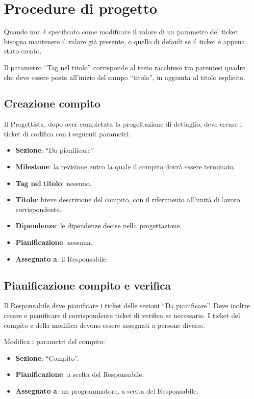 \section{Procedure di progetto}
\label{procedurediprogetto}

Quando non è specificato come modificare il valore di un parametro del ticket bisogna mantenere il valore già presente, o quello di default se il ticket è appena stato creato.

Il parametro ``Tag nel titolo'' corrisponde al testo racchiuso tra parentesi quadre che deve essere posto all'inizio del campo ``titolo'', in aggiunta al titolo esplicito.

\subsection{Creazione compito}

Il Progettista, dopo aver completata la progettazione di dettaglio, deve creare i ticket di codifica con i seguenti parametri:
\begin{itemize}
 \item \textbf{Sezione}: ``Da pianificare''
 \item \textbf{Milestone}: la revisione entro la quale il compito dovrà essere terminato.
 \item \textbf{Tag nel titolo}: nessuno.
 \item \textbf{Titolo}: breve descrizione del compito, con il riferimento all'unità di lavoro corrispondente.
 \item \textbf{Dipendenze}: le dipendenze decise nella progettazione.
 \item \textbf{Pianificazione}: nessuna.
 \item \textbf{Assegnato a}: il Responsabile.
\end{itemize}

\subsection{Pianificazione compito e verifica}

\label{pianificazione}
Il Responsabile deve pianificare i ticket delle sezioni ``Da pianificare''. Deve inoltre creare e pianificare il corrispondente ticket di verifica se necessario. I ticket del compito e della modifica devono essere assegnati a persone diverse.

Modifica i parametri del compito:
\begin{itemize}
 \item \textbf{Sezione}: ``Compito''.
 \item \textbf{Pianificazione}: a scelta del Responsabile.
 \item \textbf{Assegnato a}: un programmatore, a scelta del Responsabile.
\end{itemize}

